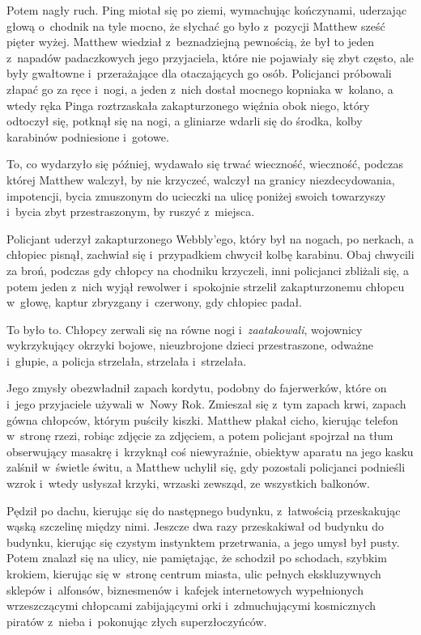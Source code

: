 \documentclass[oneside,polish,11pt,rmheadings]{mwbk}
\begin{document}
Potem nagły ruch. Ping miotał się po ziemi, wymachując kończynami, uderzając głową o~chodnik na tyle mocno, że słychać go było z~pozycji Matthew sześć pięter wyżej. Matthew wiedział z~beznadziejną pewnością, że był to jeden z~napadów padaczkowych jego przyjaciela, które nie pojawiały się zbyt często, ale były gwałtowne i~przerażające dla otaczających go osób. Policjanci próbowali złapać go za ręce i~nogi, a jeden z~nich dostał mocnego kopniaka w~kolano, a wtedy ręka Pinga roztrzaskała zakapturzonego więźnia obok niego, który odtoczył się, potknął się na nogi, a gliniarze wdarli się do środka, kolby karabinów podniesione i~gotowe.

To, co wydarzyło się później, wydawało się trwać wieczność, wieczność, podczas której Matthew walczył, by nie krzyczeć, walczył na granicy niezdecydowania, impotencji, bycia zmuszonym do ucieczki na ulicę poniżej swoich towarzyszy i~bycia zbyt przestraszonym, by ruszyć z~miejsca.

Policjant uderzył zakapturzonego Webbly'ego, który był na nogach, po nerkach, a chłopiec pisnął, zachwiał się i~przypadkiem chwycił kolbę karabinu. Obaj chwycili za broń, podczas gdy chłopcy na chodniku krzyczeli, inni policjanci zbliżali się, a potem jeden z~nich wyjął rewolwer i~spokojnie strzelił zakapturzonemu chłopcu w~głowę, kaptur zbryzgany i~czerwony, gdy chłopiec padał.

To było to. Chłopcy zerwali się na równe nogi i~\textit{zaatakowali}, wojownicy wykrzykujący okrzyki bojowe, nieuzbrojone dzieci przestraszone, odważne i~głupie, a policja strzelała, strzelała i~strzelała.

Jego zmysły obezwładnił zapach kordytu, podobny do fajerwerków, które on i~jego przyjaciele używali w~Nowy Rok. Zmieszał się z~tym zapach krwi, zapach gówna chłopców, którym puściły kiszki. Matthew płakał cicho, kierując telefon w~stronę rzezi, robiąc zdjęcie za zdjęciem, a potem policjant spojrzał na tłum obserwujący masakrę i~krzyknął coś niewyraźnie, obiektyw aparatu na jego kasku zalśnił w~świetle świtu, a Matthew uchylił się, gdy pozostali policjanci podnieśli wzrok i~wtedy usłyszał krzyki, wrzaski zewsząd, ze wszystkich balkonów.

Pędził po dachu, kierując się do następnego budynku, z~łatwością przeskakując wąską szczelinę między nimi. Jeszcze dwa razy przeskakiwał od budynku do budynku, kierując się czystym instynktem przetrwania, a jego umysł był pusty. Potem znalazł się na ulicy, nie pamiętając, że schodził po schodach, szybkim krokiem, kierując się w~stronę centrum miasta, ulic pełnych ekskluzywnych sklepów i~alfonsów, biznesmenów i~kafejek internetowych wypełnionych wrzeszczącymi chłopcami zabijającymi orki i~zdmuchującymi kosmicznych piratów z~nieba i~pokonując złych superzłoczyńców.
\end{document}
